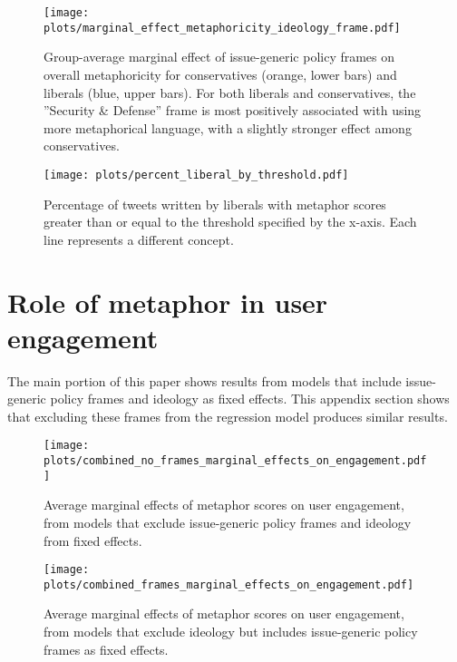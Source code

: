 \begin{figure}[htbp!]
    \centering
    \texttt{[image: plots/marginal\_effect\_metaphoricity\_ideology\_frame.pdf]}
    \caption{Group-average marginal effect of issue-generic policy frames on overall metaphoricity for conservatives (orange, lower bars) and liberals (blue, upper bars). For both liberals and conservatives, the ''Security \& Defense'' frame is most positively associated with using more metaphorical language, with a slightly stronger effect among conservatives. }
    \label{fig:ideology-by-frame}
\end{figure}



\begin{figure}[htbp!]
    \centering
    \texttt{[image: plots/percent\_liberal\_by\_threshold.pdf]}
    \caption{Percentage of tweets written by liberals with metaphor scores greater than or equal to the threshold specified by the x-axis. Each line represents a different concept.}
    \label{fig:percent-liberal}
\end{figure}






\newpage
\section{Role of metaphor in user engagement}
The main portion of this paper shows results from models that include issue-generic policy frames and ideology as fixed effects. This appendix section shows that excluding these frames from the regression model produces similar results.

\begin{figure}[htbp!]
    \centering
    \texttt{[image: plots/combined\_no\_frames\_marginal\_effects\_on\_engagement.pdf]}
    \caption{Average marginal effects of metaphor scores on user engagement, from models that exclude issue-generic policy frames and ideology from fixed effects.}
    \label{fig:engagement-no-frame-no-ideology}
\end{figure}

\begin{figure}[htbp!]
    \centering
    \texttt{[image: plots/combined\_frames\_marginal\_effects\_on\_engagement.pdf]}
    \caption{Average marginal effects of metaphor scores on user engagement, from models that exclude ideology but includes issue-generic policy frames as fixed effects.}
    \label{fig:engagement-no-frame}
\end{figure}

